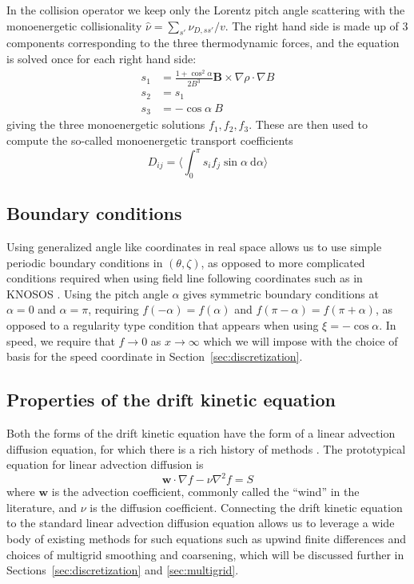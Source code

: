 \documentclass[11pt]{article}
\begin{document}
In the collision operator we keep only the Lorentz pitch angle scattering with
the monoenergetic collisionality $\hat{\nu} = \sum_{s'} \nu_{D,ss'} / v$. The
right hand side is made up of 3 components corresponding to the three
thermodynamic forces, and the equation is solved once for each right hand side:
\begin{align}
s_1 &= \frac{1 + \cos^2 \alpha}{2B^3} \mathbf{B} \times \nabla \rho \cdot \nabla
B \\
s_2 &= s_1 \\
s_3 &= -\cos{\alpha} ~B
\end{align}
giving the three monoenergetic solutions $f_1, f_2, f_3$. These are then used
to compute the so-called monoenergetic transport coefficients
\begin{equation}
D_{ij} = \Bigg\langle \int_0^\pi s_i f_j \sin{\alpha} ~\mathrm{d}\alpha
\Bigg\rangle
\end{equation}
\subsection{Boundary conditions}
\label{sec:bcs}

Using generalized angle like coordinates in real space allows us to use simple
periodic boundary conditions in $(\theta, \zeta)$, as opposed to more
complicated conditions required when using field line following coordinates
such as in KNOSOS \cite{velasco_knosos_2020}. Using the pitch angle $\alpha$
gives symmetric
boundary conditions at $\alpha=0$ and $\alpha=\pi$, requiring
$f(-\alpha) = f(\alpha)$ and $f(\pi -\alpha) = f(\pi + \alpha)$, as opposed to a
regularity type condition that appears when using $\xi = -\cos \alpha$. In
speed, we require that $f \rightarrow 0$ as $x \rightarrow \infty$ which we will
impose with the choice of basis for the speed coordinate in
Section~\ref{sec:discretization}.

\subsection{Properties of the drift kinetic equation}
\label{sec:properties}

Both the forms of the drift kinetic equation have the form of a linear
advection diffusion equation, for which there is a rich history of methods
\cite{morton_numerical_1996}. The prototypical equation for linear advection
diffusion is
\begin{equation}
\mathbf{w} \cdot \nabla f - \nu \nabla^2 f = S
\end{equation}
where $\mathbf{w}$ is the advection coefficient, commonly called the ``wind'' in the
literature, and $\nu$ is the diffusion coefficient. Connecting the drift kinetic
equation to the standard linear advection diffusion equation allows us to leverage a
wide body of existing methods for such equations such as upwind finite differences
and choices of multigrid smoothing and coarsening, which will be discussed further
in Sections~\ref{sec:discretization} and \ref{sec:multigrid}.
\end{document}
